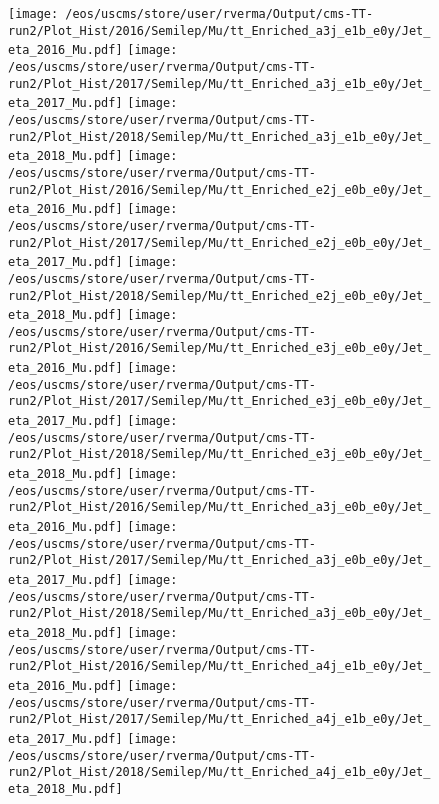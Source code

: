 \begin{figure}
\centering
\texttt{[image: /eos/uscms/store/user/rverma/Output/cms-TT-run2/Plot\_Hist/2016/Semilep/Mu/tt\_Enriched\_a3j\_e1b\_e0y/Jet\_eta\_2016\_Mu.pdf]}
\texttt{[image: /eos/uscms/store/user/rverma/Output/cms-TT-run2/Plot\_Hist/2017/Semilep/Mu/tt\_Enriched\_a3j\_e1b\_e0y/Jet\_eta\_2017\_Mu.pdf]}
\texttt{[image: /eos/uscms/store/user/rverma/Output/cms-TT-run2/Plot\_Hist/2018/Semilep/Mu/tt\_Enriched\_a3j\_e1b\_e0y/Jet\_eta\_2018\_Mu.pdf]}
\texttt{[image: /eos/uscms/store/user/rverma/Output/cms-TT-run2/Plot\_Hist/2016/Semilep/Mu/tt\_Enriched\_e2j\_e0b\_e0y/Jet\_eta\_2016\_Mu.pdf]}
\texttt{[image: /eos/uscms/store/user/rverma/Output/cms-TT-run2/Plot\_Hist/2017/Semilep/Mu/tt\_Enriched\_e2j\_e0b\_e0y/Jet\_eta\_2017\_Mu.pdf]}
\texttt{[image: /eos/uscms/store/user/rverma/Output/cms-TT-run2/Plot\_Hist/2018/Semilep/Mu/tt\_Enriched\_e2j\_e0b\_e0y/Jet\_eta\_2018\_Mu.pdf]}
\texttt{[image: /eos/uscms/store/user/rverma/Output/cms-TT-run2/Plot\_Hist/2016/Semilep/Mu/tt\_Enriched\_e3j\_e0b\_e0y/Jet\_eta\_2016\_Mu.pdf]}
\texttt{[image: /eos/uscms/store/user/rverma/Output/cms-TT-run2/Plot\_Hist/2017/Semilep/Mu/tt\_Enriched\_e3j\_e0b\_e0y/Jet\_eta\_2017\_Mu.pdf]}
\texttt{[image: /eos/uscms/store/user/rverma/Output/cms-TT-run2/Plot\_Hist/2018/Semilep/Mu/tt\_Enriched\_e3j\_e0b\_e0y/Jet\_eta\_2018\_Mu.pdf]}
\texttt{[image: /eos/uscms/store/user/rverma/Output/cms-TT-run2/Plot\_Hist/2016/Semilep/Mu/tt\_Enriched\_a3j\_e0b\_e0y/Jet\_eta\_2016\_Mu.pdf]}
\texttt{[image: /eos/uscms/store/user/rverma/Output/cms-TT-run2/Plot\_Hist/2017/Semilep/Mu/tt\_Enriched\_a3j\_e0b\_e0y/Jet\_eta\_2017\_Mu.pdf]}
\texttt{[image: /eos/uscms/store/user/rverma/Output/cms-TT-run2/Plot\_Hist/2018/Semilep/Mu/tt\_Enriched\_a3j\_e0b\_e0y/Jet\_eta\_2018\_Mu.pdf]}
\texttt{[image: /eos/uscms/store/user/rverma/Output/cms-TT-run2/Plot\_Hist/2016/Semilep/Mu/tt\_Enriched\_a4j\_e1b\_e0y/Jet\_eta\_2016\_Mu.pdf]}
\texttt{[image: /eos/uscms/store/user/rverma/Output/cms-TT-run2/Plot\_Hist/2017/Semilep/Mu/tt\_Enriched\_a4j\_e1b\_e0y/Jet\_eta\_2017\_Mu.pdf]}
\texttt{[image: /eos/uscms/store/user/rverma/Output/cms-TT-run2/Plot\_Hist/2018/Semilep/Mu/tt\_Enriched\_a4j\_e1b\_e0y/Jet\_eta\_2018\_Mu.pdf]}
\end{figure}

